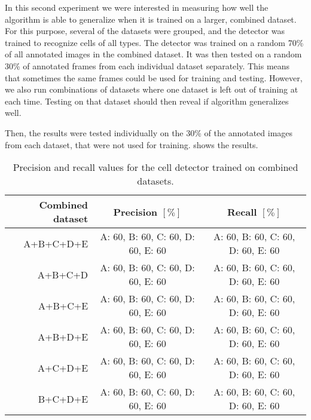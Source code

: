 		In this second experiment we were interested in measuring how well the algorithm is able to generalize when it is trained on a larger, combined dataset. For this purpose, several of the datasets were grouped, and the detector was trained to recognize cells of all types. The detector was trained on a random 70\% of all annotated images in the combined dataset. It was then tested on a random 30\% of annotated frames from each individual dataset separately. This means that sometimes the same frames could be used for training and testing. However, we also run combinations of datasets where one dataset is left out of training at each time. Testing on that dataset should then reveal if algorithm generalizes well.
		
		
		Then, the results were tested individually on the 30\% of the annotated images from each dataset, that were not used for training.  shows the results.
		
		
		
		
		
		\begin{table}[h]
			\centering
			\begin{tabular}{rcc}
				Combined dataset &                  Precision $\left[ \% \right]$ &                     Recall $\left[ \% \right]$  \\
			\hline
				       A+B+C+D+E & A: 60, B: 60, C: 60, D: 60, E: 60 & A: 60, B: 60, C: 60, D: 60, E: 60 \\
				       A+B+C+D & A: 60, B: 60, C: 60, D: 60, E: 60 & A: 60, B: 60, C: 60, D: 60, E: 60 \\
				       A+B+C+E & A: 60, B: 60, C: 60, D: 60, E: 60 & A: 60, B: 60, C: 60, D: 60, E: 60 \\
				       A+B+D+E & A: 60, B: 60, C: 60, D: 60, E: 60 & A: 60, B: 60, C: 60, D: 60, E: 60 \\
				       A+C+D+E & A: 60, B: 60, C: 60, D: 60, E: 60 & A: 60, B: 60, C: 60, D: 60, E: 60 \\
				       B+C+D+E & A: 60, B: 60, C: 60, D: 60, E: 60 & A: 60, B: 60, C: 60, D: 60, E: 60 \\
			\end{tabular} 
			\caption{Precision and recall values for the cell detector trained on combined datasets.}
			\label{tab:results_detector_combined}
		\end{table}
				
